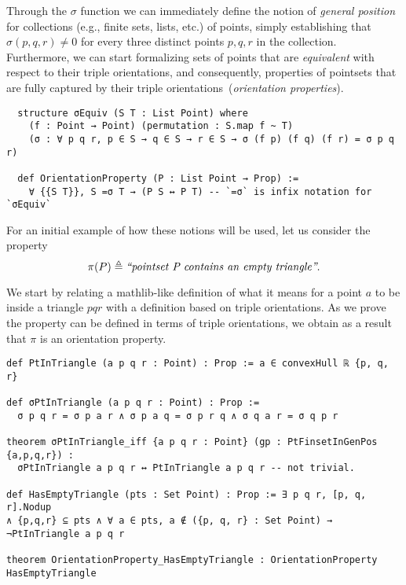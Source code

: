 Through the $\sigma$ function we can immediately define the notion of \emph{general position} for collections (e.g., finite sets, lists, etc.) of points, simply establishing that $\sigma(p, q, r) \neq 0$ for every three distinct points $p, q, r$ in the collection.
Furthermore, we can start formalizing sets of points that are \emph{equivalent} with respect to their triple orientations, and consequently, properties of pointsets that are fully captured by their triple orientations~(\emph{orientation properties}).



\begin{lstlisting}
  structure σEquiv (S T : List Point) where
    (f : Point → Point) (permutation : S.map f ~ T)
    (σ : ∀ p q r, p ∈ S → q ∈ S → r ∈ S → σ (f p) (f q) (f r) = σ p q r)

  def OrientationProperty (P : List Point → Prop) :=
    ∀ {{S T}}, S =σ T → (P S ↔ P T) -- `=σ` is infix notation for `σEquiv`
\end{lstlisting}


For an initial example of how these notions will be used, let us consider the property
\[
  \pi(P) \triangleq \text{\em ``pointset P contains an empty triangle''}.
\]

We start by relating a \textsf{mathlib}-like definition of what it means for a point $a$ to be inside a triangle $pqr$ with a definition based on triple orientations. As we prove the property can be defined in terms of triple orientations, we obtain as a result that $\pi$ is an orientation property.

\begin{lstlisting}
def PtInTriangle (a p q r : Point) : Prop := a ∈ convexHull ℝ {p, q, r}

def σPtInTriangle (a p q r : Point) : Prop :=
  σ p q r = σ p a r ∧ σ p a q = σ p r q ∧ σ q a r = σ q p r

theorem σPtInTriangle_iff {a p q r : Point} (gp : PtFinsetInGenPos {a,p,q,r}) :
  σPtInTriangle a p q r ↔ PtInTriangle a p q r -- not trivial.

def HasEmptyTriangle (pts : Set Point) : Prop := ∃ p q r, [p, q, r].Nodup
∧ {p,q,r} ⊆ pts ∧ ∀ a ∈ pts, a ∉ ({p, q, r} : Set Point) → ¬PtInTriangle a p q r

theorem OrientationProperty_HasEmptyTriangle : OrientationProperty HasEmptyTriangle
\end{lstlisting}

